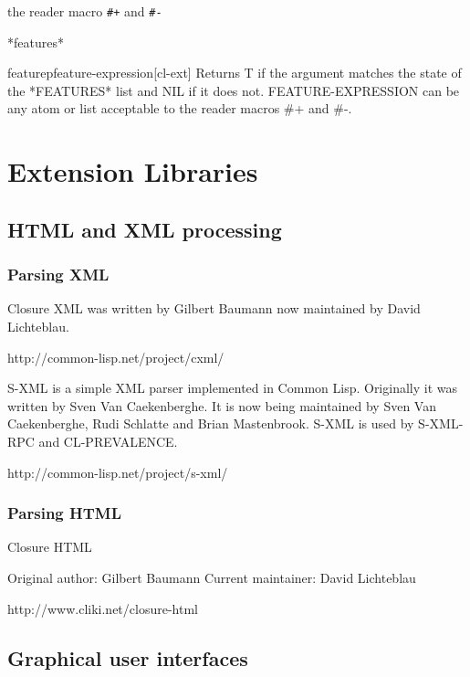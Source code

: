 \documentclass[10pt,english]{book}
\begin{document}
the reader macro \texttt{\#+} and \texttt{\#-}

\begin{variable}{*features*}{}
  
\end{variable}

\begin{function}{featurep}{feature-expression}[cl-ext]
  Returns T if the argument matches the state of the *FEATURES*
list and NIL if it does not. FEATURE-EXPRESSION can be any atom
or list acceptable to the reader macros \#+ and \#-.
\end{function}

\part{Extension Libraries}
\label{part:libraries}


\chapter{HTML and XML processing}
\label{cha:html-xml-processing}

\section{Parsing XML}
\label{sec:parsing-xml}

Closure XML was written by Gilbert Baumann now maintained by David
Lichteblau. 

http://common-lisp.net/project/cxml/

S-XML is a simple XML parser implemented in Common Lisp. Originally it
was written by Sven Van Caekenberghe. It is now being maintained by
Sven Van Caekenberghe, Rudi Schlatte and Brian Mastenbrook. S-XML is
used by S-XML-RPC and CL-PREVALENCE.

http://common-lisp.net/project/s-xml/

\section{Parsing HTML}
\label{sec:parsing-html}

Closure HTML

Original author: Gilbert Baumann
Current maintainer: David Lichteblau 

http://www.cliki.net/closure-html




\chapter{Graphical user interfaces}
\label{cha:graph-user-interf}
\end{document}

